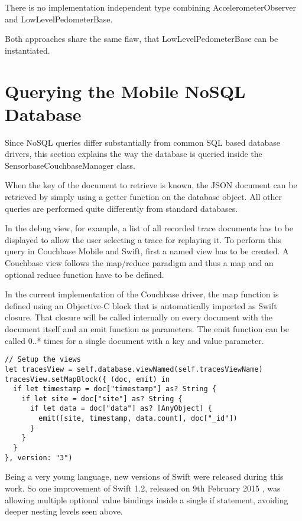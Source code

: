 There is no implementation independent type combining AccelerometerObserver and LowLevelPedometerBase.

Both approaches share the same flaw, that LowLevelPedometerBase can be instantiated.

\section{Querying the Mobile NoSQL Database}
\label{sec:nosql-query}

Since NoSQL queries differ substantially from common SQL based database drivers, this section explains the way the database is queried inside the SensorbaseCouchbaseManager class. 

When the key of the document to retrieve is known, the JSON document can be retrieved by simply using a getter function on the database object. All other queries are performed quite differently from standard databases. 

In the debug view, for example, a list of all recorded trace documents has to be displayed to allow the user selecting a trace for replaying it.
To perform this query in Couchbase Mobile and Swift, first a named view has to be created. A Couchbase view follows the map/reduce paradigm and thus a map and an optional reduce function have to be defined. 

In the current implementation of the Couchbase driver, the map function is defined using an Objective-C block that is automatically imported as Swift closure. That closure will be called internally on every document with the document itself and an emit function as parameters. The emit function can be called 0..* times for a single document with a key and value parameter. 

\begin{lstlisting}[basicstyle=\footnotesize,caption=The map function of the traces view]
// Setup the views
let tracesView = self.database.viewNamed(self.tracesViewName)
tracesView.setMapBlock({ (doc, emit) in
  if let timestamp = doc["timestamp"] as? String {
    if let site = doc["site"] as? String {
      if let data = doc["data"] as? [AnyObject] {
        emit([site, timestamp, data.count], doc["_id"])
      }
    }
  }
}, version: "3")
\end{lstlisting}

Being a very young language, new versions of Swift were released during this work. So one improvement of Swift 1.2, released on 9th February 2015 \cite{swift-1-2}, was allowing multiple optional value bindings inside a single if statement, avoiding deeper nesting levels seen above. 

